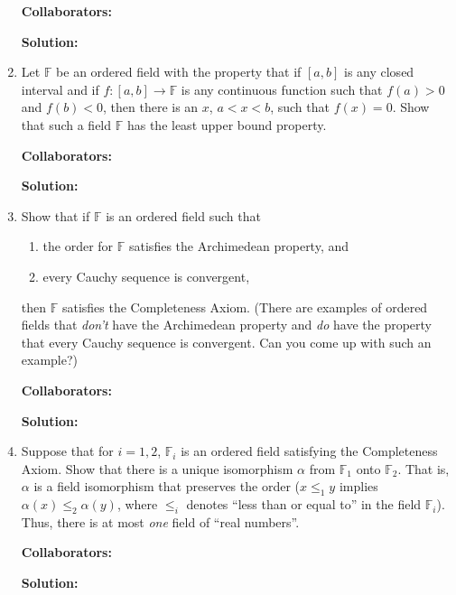 \documentclass{article}%
\begin{document}
\begin{enumerate}
\bigskip
\textbf{Collaborators:}\\
\smallskip
 
\textbf{Solution:}
\bigskip



\item Let $\mathbb{F}$ be an ordered field with the property that if $[a,b]$ is any closed interval and if $f:[a,b]\rightarrow \mathbb{F}$ is any continuous function such that $f(a)>0$ and $f(b)<0$, then there is an $x$, $a < x < b$, such that $f(x)=0$.  Show that such a field $\mathbb{F}$ has the least upper bound property.


\bigskip
\textbf{Collaborators:}\\
\smallskip
 
\textbf{Solution:}
\bigskip


\item Show that if $\mathbb{F}$ is an ordered field such that
\begin{enumerate}
\item the order for $\mathbb{F}$ satisfies the Archimedean property, and
\item every Cauchy sequence is convergent, 
\end{enumerate}
then $\mathbb{F}$ satisfies the Completeness Axiom. (There are examples of ordered fields that \emph{don't} have the Archimedean property and \emph{do} have the property that every Cauchy sequence is convergent.  Can you come up with such an example?)


\bigskip
\textbf{Collaborators:}\\
\smallskip
 
\textbf{Solution:}
\bigskip


\item Suppose that for $i = 1,2$, $\mathbb{F}_i$ is an ordered field satisfying the Completeness Axiom. Show that there is a unique isomorphism $\alpha$ from $\mathbb{F}_1$ onto $\mathbb{F}_2$. That is, $\alpha$ is a field isomorphism that preserves the order ($x \leq_1 y$ implies $\alpha(x) \leq_2 \alpha(y)$, where $\leq_i$ denotes ``less than or equal to'' in the field $\mathbb{F}_i$). Thus, there is at most \emph{one} field of ``real numbers''. 


\bigskip
\textbf{Collaborators:}\\
\smallskip
 
\textbf{Solution:}
\bigskip


\end{enumerate}
\end{document}
